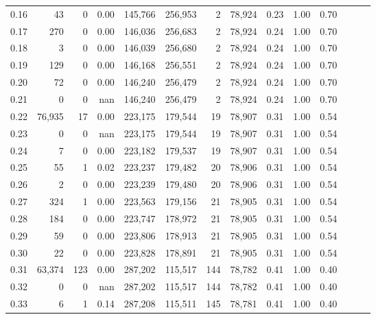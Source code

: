 \begin{tabular}{rrrrrrrrrrrrrr}
0.16 &      43 &       0 &  0.00 &  145,766 &  256,953 &       2 &  78,924 &  0.23 &  1.00 &      0.70 \\
0.17 &     270 &       0 &  0.00 &  146,036 &  256,683 &       2 &  78,924 &  0.24 &  1.00 &      0.70 \\
0.18 &       3 &       0 &  0.00 &  146,039 &  256,680 &       2 &  78,924 &  0.24 &  1.00 &      0.70 \\
0.19 &     129 &       0 &  0.00 &  146,168 &  256,551 &       2 &  78,924 &  0.24 &  1.00 &      0.70 \\
0.20 &      72 &       0 &  0.00 &  146,240 &  256,479 &       2 &  78,924 &  0.24 &  1.00 &      0.70 \\
0.21 &       0 &       0 &   nan &  146,240 &  256,479 &       2 &  78,924 &  0.24 &  1.00 &      0.70 \\
0.22 &  76,935 &      17 &  0.00 &  223,175 &  179,544 &      19 &  78,907 &  0.31 &  1.00 &      0.54 \\
0.23 &       0 &       0 &   nan &  223,175 &  179,544 &      19 &  78,907 &  0.31 &  1.00 &      0.54 \\
0.24 &       7 &       0 &  0.00 &  223,182 &  179,537 &      19 &  78,907 &  0.31 &  1.00 &      0.54 \\
0.25 &      55 &       1 &  0.02 &  223,237 &  179,482 &      20 &  78,906 &  0.31 &  1.00 &      0.54 \\
0.26 &       2 &       0 &  0.00 &  223,239 &  179,480 &      20 &  78,906 &  0.31 &  1.00 &      0.54 \\
0.27 &     324 &       1 &  0.00 &  223,563 &  179,156 &      21 &  78,905 &  0.31 &  1.00 &      0.54 \\
0.28 &     184 &       0 &  0.00 &  223,747 &  178,972 &      21 &  78,905 &  0.31 &  1.00 &      0.54 \\
0.29 &      59 &       0 &  0.00 &  223,806 &  178,913 &      21 &  78,905 &  0.31 &  1.00 &      0.54 \\
0.30 &      22 &       0 &  0.00 &  223,828 &  178,891 &      21 &  78,905 &  0.31 &  1.00 &      0.54 \\
0.31 &  63,374 &     123 &  0.00 &  287,202 &  115,517 &     144 &  78,782 &  0.41 &  1.00 &      0.40 \\
0.32 &       0 &       0 &   nan &  287,202 &  115,517 &     144 &  78,782 &  0.41 &  1.00 &      0.40 \\
0.33 &       6 &       1 &  0.14 &  287,208 &  115,511 &     145 &  78,781 &  0.41 &  1.00 &      0.40 \\

\end{tabular}
